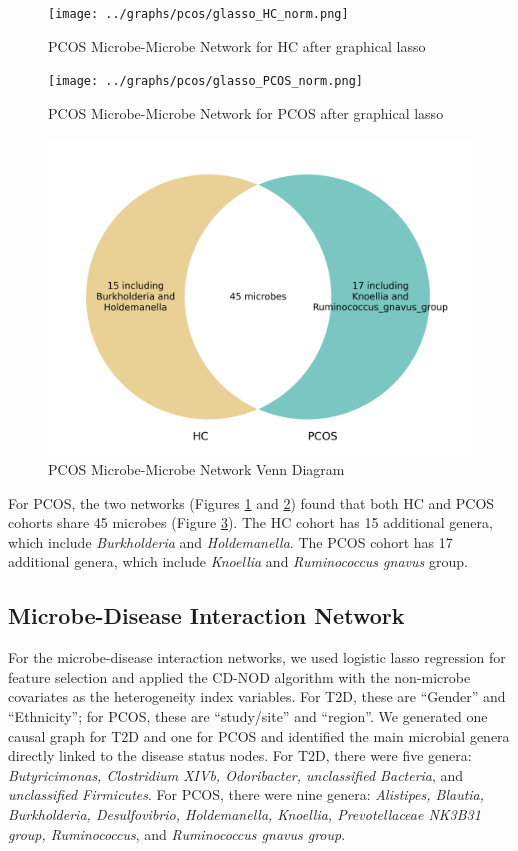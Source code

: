 \documentclass[12pt,letterpaper]{article}
\begin{document}
\begin{figure}[h!]
  \centering
  \texttt{[image: ../graphs/pcos/glasso\_HC\_norm.png]}
  \caption{PCOS Microbe-Microbe Network for HC after graphical lasso}
  \label{fig:pcosglassoHCnorm}
\end{figure}

\begin{figure}[h!]
  \centering
  \texttt{[image: ../graphs/pcos/glasso\_PCOS\_norm.png]}
  \caption{PCOS Microbe-Microbe Network for PCOS after graphical lasso}
  \label{fig:pcosglassoPCOSnorm}
\end{figure}

\begin{figure}[h!]
  \centering
  \includegraphics[width=0.8\linewidth]{../poster/pcos_microbe_microbe_venn.png}
  \caption{PCOS Microbe-Microbe Network Venn Diagram}
  \label{fig:pcosglassovenn}
\end{figure}

For PCOS, the two networks (Figures \ref{fig:pcosglassoHCnorm} and \ref{fig:pcosglassoPCOSnorm}) found that both HC and PCOS cohorts share 45 microbes (Figure \ref{fig:pcosglassovenn}). The HC cohort has 15 additional genera, which include \textit{Burkholderia} and \textit{Holdemanella}. The PCOS cohort has 17 additional genera, which include \textit{Knoellia} and \textit{Ruminococcus gnavus} group. 

\subsection{Microbe-Disease Interaction Network}

For the microbe-disease interaction networks, we used logistic lasso regression for feature selection and applied the CD-NOD algorithm with the non-microbe covariates as the heterogeneity index variables. For T2D, these are “Gender” and “Ethnicity”; for PCOS, these are “study/site” and “region”. We generated one causal graph for T2D and one for PCOS and identified the main microbial genera directly linked to the disease status nodes. For T2D, there were five genera: \textit{Butyricimonas, Clostridium XIVb, Odoribacter, unclassified Bacteria}, and \textit{unclassified Firmicutes}. For PCOS, there were nine genera: \textit{Alistipes, Blautia, Burkholderia, Desulfovibrio, Holdemanella, Knoellia, Prevotellaceae NK3B31 group, Ruminococcus}, and \textit{Ruminococcus gnavus group}.
\end{document}
